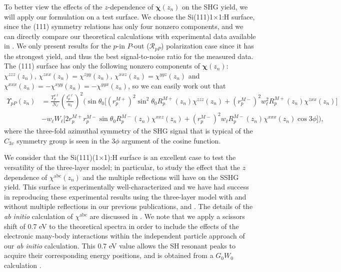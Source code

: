 \documentclass[utf8]{frontiersSCNS}
\begin{document}
To better view the effects of the $z$-dependence of $\boldsymbol{\chi}(z_{n})$
on the SHG yield, we will apply our formulation on a test surface. We choose the
Si(111)1$\times$1:H surface, since the (111) symmetry relations has only four
nonzero components, and we can directly compare our theoretical calculations
with experimental data available in \cite{mejiaPRB02}. We only present results
for the $p$-in $P$-out ($\mathcal{R}_{pP}$) polarization case since it has the
strongest yield, and thus the best signal-to-noise ratio for the measured data.
The (111) surface has only the following nonzero components of
$\boldsymbol{\chi}(z_{n})$: $\chi^{zzz}(z_{n})$, $\chi^{zxx}(z_{n}) =
\chi^{zyy}(z_{n })$, $\chi^{xxz}(z_{n}) = \chi^{yyz}(z_{n})$ and
$\chi^{xxx}(z_{n}) = -\chi^{xyy}(z_{n}) = -\chi^{yyx}(z_{n})$, so we can easily
work out that
\begin{equation}\label{eq:rpp111}
\begin{split}
\Upsilon_{pP}(z_{n}) &=
\frac{T^{v\ell}_{p}}{N_{\ell}}
\left(\frac{t^{v\ell}_{p}}{n_{\ell}}\right)^{2}
\Bigg(
\sin\theta_{0}
\Big[
  \left(r^{M+}_{p}\right)^{2}\sin^{2}\theta_{0}R^{M+}_{p}(z_{n})
\chi^{zzz}(z_{n})
+ \left(r^{M-}_{p}\right)^{2}w^{2}_{\ell}R^{M+}_{p}(z_{n})\chi^{zxx}(z_{n})
\Big]\\
&- 
w_{\ell}W_{\ell}
\Big[
  2r^{M+}_{p}r^{M-}_{p}\sin\theta_{0}R^{M-}_{p}(z_{n})\chi^{xxz}(z_{n})
+ \left(r^{M-}_{p}\right)^{2}w_{\ell}R^{M-}_{p}(z_{n})\chi^{xxx}(z_{n})\cos3\phi 
\Big]\Bigg),
\end{split}
\end{equation}
where the three-fold azimuthal symmetry of the SHG signal that is typical of the
$C_{3v}$ symmetry group is seen in the $3\phi$ argument of the cosine function.

We consider that the Si(111)(1$\times$1):H surface is an excellent case to test
the versatility of the three-layer model; in particular, to study the effect
that the $z$ dependence of $\chi^{\mathrm{abc}}(z_{n})$ and the multiple
reflections will have on the SSHG yield. This surface is experimentally
well-characterized \citep{mitchellSS01, mejiaPRB02, bergfeldPRL04} and we have
had success in reproducing these experimental results using the three-layer
model with and without multiple reflections in our previous publications,
\cite{andersonPRB16a} and \cite{andersonPRB16b}. The details of the \emph{ab
initio} calculation of $\chi^{\mathrm{abc}}$ are discussed in
\cite{andersonPRB16a}. We note that we apply a scissors shift of 0.7 eV to the
theoretical spectra in order to include the effects of the electronic many-body
interactions within the independent particle approach of our \emph{ab initio}
calculation. This 0.7 eV value allows the SH resonant peaks to acquire their
corresponding energy positions, and is obtained from a $G_{0}W_{0}$ calculation
\citep{liPRB10, andersonPRB16a}.
\end{document}

